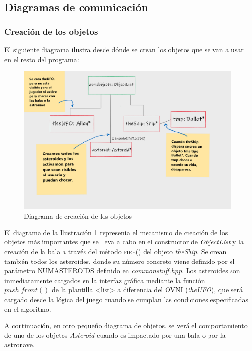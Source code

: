 \subsection{Diagramas de comunicación}
\subsubsection{Creación de los objetos}

El siguiente diagrama ilustra desde dónde se crean los objetos que se van a usar en el resto del programa:

\begin{figure}[H]
    \centering
    \includegraphics[width=\textwidth]{fotos/Creacion.png}
    \caption{Diagrama de creación de los objetos}
    \label{creacion}
\end{figure}

El diagrama de la Ilustración \ref{creacion} representa el mecanismo de creación de los objetos más importantes que se lleva a cabo en el constructor de \emph{ObjectList} y la creación de la bala a través del método \textsc{fire()} del objeto \emph{theShip}. Se crean también todos los asteroides, donde su número concreto viene definido por el parámetro NUMASTEROIDS definido en \emph{commonstuff.hpp}. Los asteroides son inmediatamente cargados en la interfaz gráfica mediante la función $push\_front()$ de la plantilla {\textless list\textgreater} a diferencia del OVNI (\emph{theUFO}), que será cargado desde la lógica del juego cuando se cumplan las condiciones especificadas en el algoritmo.

A continuación, en otro pequeño diagrama de objetos, se verá el comportamiento de uno de los objetos \emph{Asteroid} cuando es impactado por una bala o por la astronave.

